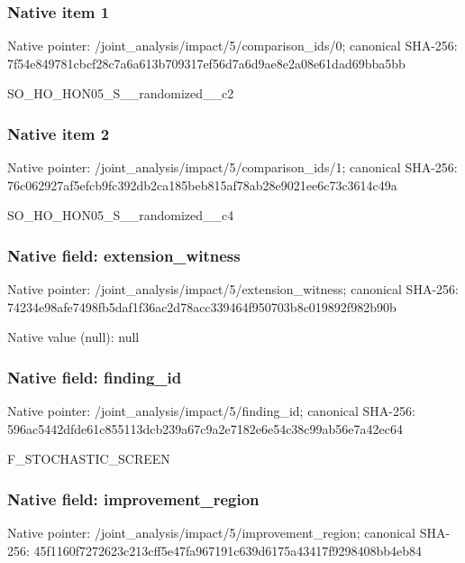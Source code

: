 \documentclass[10pt,a4paper]{article}
\begin{document}
\subsubsection{Native item 1}
Native pointer: /joint\_\allowbreak{}analysis/impact/5/comparison\_\allowbreak{}ids/0; canonical SHA-256: 7f54e849781cbcf28c7a6a613b709317ef56d7a6d9ae8e2a08e61dad69bba5bb

\begingroup\raggedright\sloppy SO\_\allowbreak{}HO\_\allowbreak{}HON05\_\allowbreak{}S\_\allowbreak{}\_\allowbreak{}randomized\_\allowbreak{}\_\allowbreak{}c2\par\endgroup

\subsubsection{Native item 2}
Native pointer: /joint\_\allowbreak{}analysis/impact/5/comparison\_\allowbreak{}ids/1; canonical SHA-256: 76c062927af5efcb9fc392db2ca185beb815af78ab28e9021ee6c73c3614c49a

\begingroup\raggedright\sloppy SO\_\allowbreak{}HO\_\allowbreak{}HON05\_\allowbreak{}S\_\allowbreak{}\_\allowbreak{}randomized\_\allowbreak{}\_\allowbreak{}c4\par\endgroup

\subsubsection{Native field: extension\_\allowbreak{}witness}
Native pointer: /joint\_\allowbreak{}analysis/impact/5/extension\_\allowbreak{}witness; canonical SHA-256: 74234e98afe7498fb5daf1f36ac2d78acc339464f950703b8c019892f982b90b

Native value (null): null

\subsubsection{Native field: finding\_\allowbreak{}id}
Native pointer: /joint\_\allowbreak{}analysis/impact/5/finding\_\allowbreak{}id; canonical SHA-256: 596ac5442dfde61c855113dcb239a67c9a2e7182e6e54c38c99ab56e7a42ec64

\begingroup\raggedright\sloppy F\_\allowbreak{}STOCHASTIC\_\allowbreak{}SCREEN\par\endgroup

\subsubsection{Native field: improvement\_\allowbreak{}region}
Native pointer: /joint\_\allowbreak{}analysis/impact/5/improvement\_\allowbreak{}region; canonical SHA-256: 45f1160f7272623c213cff5e47fa967191c639d6175a43417f9298408bb4eb84
\end{document}

